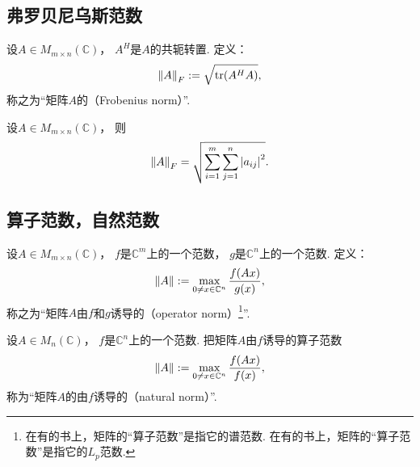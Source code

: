 \subsection{弗罗贝尼乌斯范数}
\begin{definition}%
设\(A \in M_{m \times n}(\mathbb{C})\)，
\(A^H\)是\(A\)的共轭转置.
定义：\begin{equation}
	\norm{A}_F
	:=
	\sqrt{
		\tr(A^H A)
	},
\end{equation}
称之为“矩阵\(A\)的（Frobenius norm）”.
\end{definition}

\begin{property}
设\(A \in M_{m \times n}(\mathbb{C})\)，
则\begin{equation*}
	\norm{A}_F
	= \sqrt{
		\sum_{i=1}^m
		\sum_{j=1}^n
		\abs{a_{ij}}^2
	}.
\end{equation*}
\end{property}

\subsection{算子范数，自然范数}
\begin{definition}
设\(A \in M_{m \times n}(\mathbb{C})\)，
\(f\)是\(\mathbb{C}^m\)上的一个范数，
\(g\)是\(\mathbb{C}^n\)上的一个范数.
定义：\begin{equation}
	\norm{A}
	:=
	\max_{0 \neq x \in \mathbb{C}^n} \frac{f(Ax)}{g(x)},
\end{equation}
称之为“矩阵\(A\)由\(f\)和\(g\)诱导的（operator norm）\footnote{
	在有的书上，矩阵的“算子范数”是指它的谱范数.
	在有的书上，矩阵的“算子范数”是指它的\(L_p\)范数.
}”.
\end{definition}

\begin{definition}
设\(A \in M_n(\mathbb{C})\)，
\(f\)是\(\mathbb{C}^n\)上的一个范数.
把矩阵\(A\)由\(f\)诱导的算子范数\begin{equation*}
	\norm{A}
	:=
	\max_{0 \neq x \in \mathbb{C}^n} \frac{f(Ax)}{f(x)},
\end{equation*}
称为“矩阵\(A\)的由\(f\)诱导的（natural norm）”.
\end{definition}

